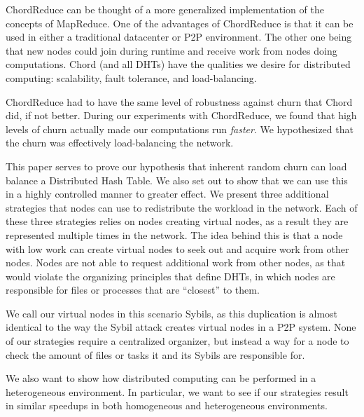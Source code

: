 \documentclass[10pt,conference]{IEEEtran}
\begin{document}



ChordReduce can be thought of a more generalized implementation of the concepts of MapReduce.
One of the advantages of ChordReduce is that it can be used in either a traditional datacenter or P2P environment.
The other one being that new nodes could join during runtime and receive work from nodes doing computations.
%
Chord (and all DHTs) have the qualities we desire for distributed computing: scalability, fault tolerance, and load-balancing.

ChordReduce had to have the same level of robustness against churn that Chord did, if not better.
During our experiments with ChordReduce, we found that high levels of churn actually made our computations run \textit{faster}.
We hypothesized that the churn was effectively load-balancing the network.




This paper serves to prove our hypothesis that inherent random churn can load balance a Distributed Hash Table.
We also set out to show that we can use this in a highly controlled manner to greater effect.
We present three additional strategies that nodes can use to redistribute the workload in the network.
Each of these three strategies relies on nodes creating virtual nodes, as a result they are represented multiple times in the network.
The idea behind this is that a node with low work can create virtual nodes to seek out and acquire work from other nodes.  
Nodes are not able to request additional work from other nodes, as that would violate the organizing principles that define DHTs, in which nodes are responsible for files or processes that are ``closest'' to them. 

We call our virtual nodes in this scenario Sybils, as this duplication is almost identical to the way the Sybil attack  \cite{sybil} creates virtual nodes in a P2P system.
None of our strategies require a centralized organizer, but instead a way for a node to check the amount of files or tasks it and its Sybils are responsible for.


We also want to show how distributed computing can be performed in a heterogeneous environment.
In particular, we want to see if our strategies result in similar speedups in both homogeneous and heterogeneous environments.
\end{document}
